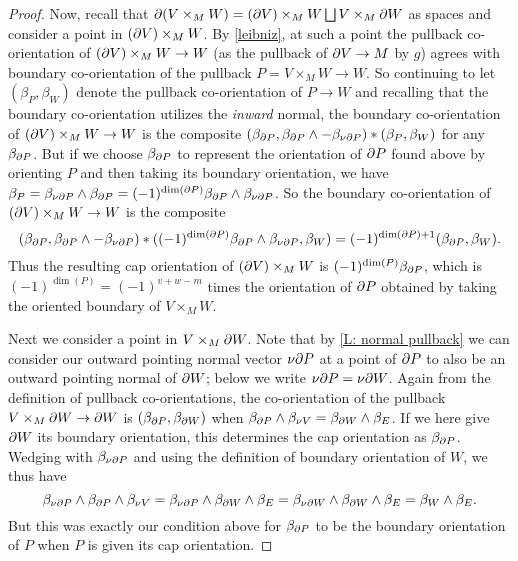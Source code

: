 \begin{proof}
	Now, recall that $\partial(V \times_M W) = (\partial V) \times_M W \bigsqcup V \times_M \partial W$ as spaces and consider a point in $(\partial V) \times_M W$.
	By \cref{leibniz}, at such a point the pullback co-orientation of $(\partial V) \times_M W \to W$ (as the pullback of $\partial V \to M$ by $g$) agrees with boundary co-orientation of the pullback $P = V \times_M W \to W$.
	So continuing to let $(\beta_P,\beta_W)$ denote the pullback co-orientation of $P \to W$ and recalling that the boundary co-orientation utilizes the \textit{inward} normal, the boundary co-orientation of $(\partial V) \times_M W \to W$ is the composite $(\beta_{\partial P}, \beta_{\partial P} \wedge -\beta_{\nu\partial P})*(\beta_P,\beta_W)$ for any $\beta_{\partial P}$.
	But if we choose $\beta_{\partial P}$ to represent the orientation of $\partial P$ found above by orienting $P$ and then taking its boundary orientation, we have $\beta_P = \beta_{\nu\partial P} \wedge \beta_{\partial P} = (-1)^{\dim(\partial P)}\beta_{\partial P} \wedge \beta_{\nu\partial P}$.
	So the boundary co-orientation of $(\partial V) \times_M W \to W$ is the composite
	$$(\beta_{\partial P}, \beta_{\partial P} \wedge -\beta_{\nu\partial P})*((-1)^{\dim(\partial P)}\beta_{\partial P} \wedge \beta_{\nu\partial P},\beta_W) = (-1)^{\dim(\partial P)+1}(\beta_{\partial P},\beta_W).$$
	Thus the resulting cap orientation of $(\partial V) \times_M W$ is $(-1)^{\dim(P)}\beta_{\partial P}$, which is $(-1)^{\dim(P)} = (-1)^{v+w-m}$ times the orientation of $\partial P$ obtained by taking the oriented boundary of $V \times_M W$.

	Next we consider a point in $V \times_M \partial W$.
	Note that by \cref{L: normal pullback} we can consider our outward pointing normal vector $\nu\partial P$ at a point of $\partial P$ to also be an outward pointing normal of $\partial W$; below we write $\nu \partial P = \nu \partial W$.
	Again from the definition of pullback co-orientations, the co-orientation of the pullback $V \times_M \partial W \to \partial W$ is $(\beta_{\partial P},\beta_{\partial W})$ when $\beta_{\partial P} \wedge \beta_{\nu V} = \beta_{\partial W} \wedge \beta_E$.
	If we here give $\partial W$ its boundary orientation, this determines the cap orientation as $\beta_{\partial P}$.
	Wedging with $\beta_{\nu\partial P}$ and using the definition of boundary orientation of $W$, we thus have
	$$\beta_{\nu\partial P} \wedge \beta_{\partial P} \wedge \beta_{\nu V} = \beta_{\nu\partial P} \wedge \beta_{\partial W} \wedge \beta_E = \beta_{\nu\partial W} \wedge \beta_{\partial W} \wedge \beta_E = \beta_W \wedge \beta_E.$$
	But this was exactly our condition above for $\beta_{\partial P}$ to be the boundary orientation of $P$ when $P$ is given its cap orientation.
\end{proof}

